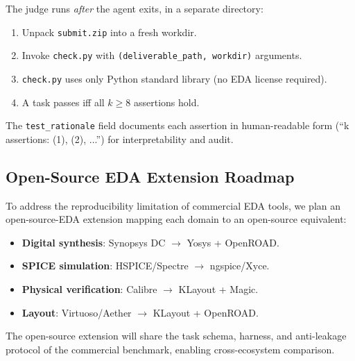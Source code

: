 The judge runs \emph{after} the agent exits, in a separate directory:
\begin{enumerate}
    \item Unpack \texttt{submit.zip} into a fresh workdir.
    \item Invoke \texttt{check.py} with \texttt{(deliverable\_path, workdir)} arguments.
    \item \texttt{check.py} uses only Python standard library (no EDA license required).
    \item A task passes iff all $k \geq 8$ assertions hold.
\end{enumerate}
The \texttt{test\_rationale} field documents each assertion in human-readable form (``k assertions: (1), (2), ...'') for interpretability and audit.

\subsection{Open-Source EDA Extension Roadmap}
\label{sec:repro-details}

To address the reproducibility limitation of commercial EDA tools, we plan an open-source-EDA extension mapping each domain to an open-source equivalent:
\begin{itemize}
    \item \textbf{Digital synthesis}: Synopsys DC $\to$ Yosys + OpenROAD.
    \item \textbf{SPICE simulation}: HSPICE/Spectre $\to$ ngspice/Xyce.
    \item \textbf{Physical verification}: Calibre $\to$ KLayout + Magic.
    \item \textbf{Layout}: Virtuoso/Aether $\to$ KLayout + OpenROAD.
\end{itemize}
The open-source extension will share the task schema, harness, and anti-leakage protocol of the commercial benchmark, enabling cross-ecosystem comparison.
